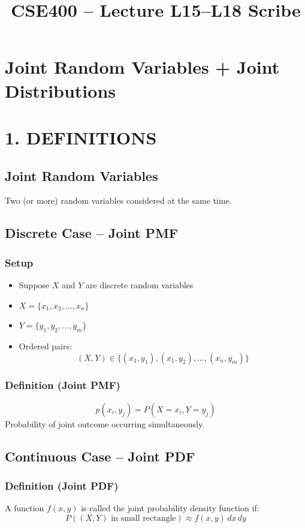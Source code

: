 \documentclass[12pt]{article}
\begin{document}
\title{CSE400 – Lecture L15–L18 Scribe}
\date{}
\maketitle

\section*{Joint Random Variables + Joint Distributions}

\section*{1. DEFINITIONS}

\subsection*{Joint Random Variables}
Two (or more) random variables considered at the same time.

\subsection*{Discrete Case – Joint PMF}

\subsubsection*{Setup}
\begin{itemize}
\item Suppose $X$ and $Y$ are discrete random variables
\item $X = \{x_1, x_2, \dots, x_n\}$
\item $Y = \{y_1, y_2, \dots, y_m\}$
\item Ordered pairs:
\[
(X,Y) \in \{(x_1,y_1), (x_1,y_2), \dots, (x_n,y_m)\}
\]
\end{itemize}

\subsubsection*{Definition (Joint PMF)}
\[
p(x_i, y_j) = P(X = x_i, Y = y_j)
\]
Probability of joint outcome occurring simultaneously.

\subsection*{Continuous Case – Joint PDF}

\subsubsection*{Definition (Joint PDF)}
A function $f(x,y)$ is called the joint probability density function if:
\[
P((X,Y) \text{ in small rectangle}) \approx f(x,y)\,dx\,dy
\]
\end{document}
